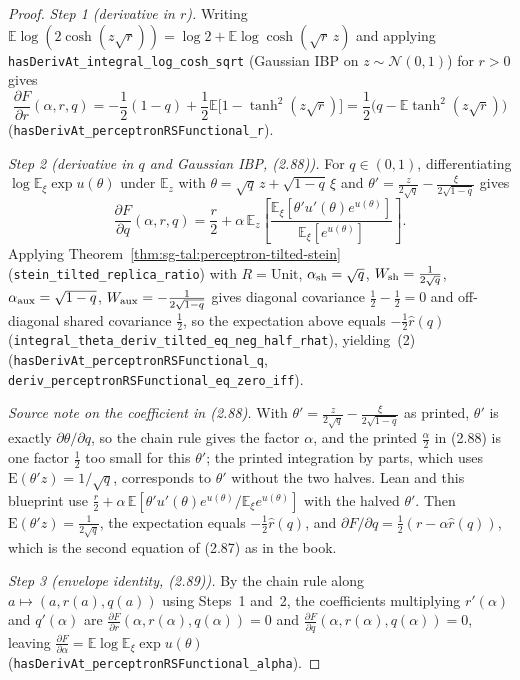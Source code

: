 \begin{proof}
  \leanok
\emph{Step 1 (derivative in $r$).} Writing $\mathbb E\log(2\cosh(z\sqrt r))
=\log 2+\mathbb E\log\cosh(\sqrt r\,z)$ and applying \texttt{hasDerivAt\_integral\_log\_cosh\_sqrt}
(Gaussian IBP on $z\sim\mathcal N(0,1)$) for $r>0$ gives
\[
 \frac{\partial F}{\partial r}(\alpha,r,q)
 =-\frac{1}{2}(1-q)+\frac{1}{2}\mathbb E\bigl[1-\tanh^2(z\sqrt r)\bigr]
 =\frac{1}{2}\bigl(q-\mathbb E\tanh^2(z\sqrt r)\bigr)
\]
(\texttt{hasDerivAt\_perceptronRSFunctional\_r}).

\emph{Step 2 (derivative in $q$ and Gaussian IBP, (2.88)).} For $q\in(0,1)$, differentiating
$\log\mathbb E_\xi\exp u(\theta)$ under $\mathbb E_z$ with $\theta=\sqrt q\,z+\sqrt{1-q}\,\xi$ and
$\theta'=\frac{z}{2\sqrt q}-\frac{\xi}{2\sqrt{1-q}}$ gives
\[
 \frac{\partial F}{\partial q}(\alpha,r,q)
 =\frac{r}{2}+\alpha\,\mathbb E_z\!\left[\frac{\mathbb E_\xi[\theta' u'(\theta)e^{u(\theta)}]}{\mathbb E_\xi[e^{u(\theta)}]}\right].
\]
Applying Theorem~\ref{thm:sg-tal:perceptron-tilted-stein} (\texttt{stein\_tilted\_replica\_ratio})
with $R=\mathrm{Unit}$, $\alpha_{\rm sh}=\sqrt q$, $W_{\rm sh}=\frac{1}{2\sqrt q}$,
$\alpha_{\rm aux}=\sqrt{1-q}$, $W_{\rm aux}=-\frac{1}{2\sqrt{1-q}}$ gives diagonal covariance
$\frac{1}{2}-\frac{1}{2}=0$ and off-diagonal shared covariance $\frac{1}{2}$, so the expectation
above equals $-\frac{1}{2}\widehat r(q)$ (\texttt{integral\_theta\_deriv\_tilted\_eq\_neg\_half\_rhat}),
yielding~(2) (\texttt{hasDerivAt\_perceptronRSFunctional\_q},
\texttt{deriv\_perceptronRSFunctional\_eq\_zero\_iff}).

\emph{Source note on the coefficient in (2.88).} With $\theta'=\frac{z}{2\sqrt q}-\frac{\xi}{2\sqrt{1-q}}$ as printed, $\theta'$ is
exactly $\partial\theta/\partial q$, so the chain rule gives the factor $\alpha$, and the printed $\frac\alpha2$ in (2.88) is one factor
$\frac12$ too small for this $\theta'$; the printed integration by parts, which uses $\mathrm E(\theta' z)=1/\sqrt q$, corresponds to
$\theta'$ without the two halves. Lean and this blueprint use $\frac r2+\alpha\,\mathbb E[\theta' u'(\theta)e^{u(\theta)}/\mathbb E_\xi e^{u(\theta)}]$ with the
halved $\theta'$. Then $\mathrm E(\theta' z)=\frac1{2\sqrt q}$, the expectation equals $-\frac12\widehat r(q)$, and
$\partial F/\partial q=\frac12(r-\alpha\widehat r(q))$, which is the second equation of (2.87) as in the book.

\emph{Step 3 (envelope identity, (2.89)).} By the chain rule along $a\mapsto(a,r(a),q(a))$ using
Steps~1 and~2, the coefficients multiplying $r'(\alpha)$ and $q'(\alpha)$ are
$\frac{\partial F}{\partial r}(\alpha,r(\alpha),q(\alpha))=0$ and
$\frac{\partial F}{\partial q}(\alpha,r(\alpha),q(\alpha))=0$, leaving
$\frac{\partial F}{\partial\alpha}=\mathbb E\log\mathbb E_\xi\exp u(\theta)$
(\texttt{hasDerivAt\_perceptronRSFunctional\_alpha}).


\end{proof}
